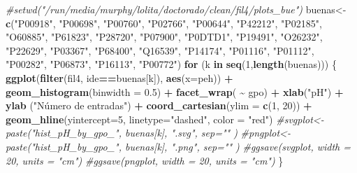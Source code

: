 \documentclass[
]{book}
\newenvironment{Shaded}{\begin{snugshade}}{\end{snugshade}}
\newcommand{\CommentTok}[1]{\textcolor[rgb]{0.56,0.35,0.01}{\textit{#1}}}
\newcommand{\ControlFlowTok}[1]{\textcolor[rgb]{0.13,0.29,0.53}{\textbf{#1}}}
\newcommand{\DataTypeTok}[1]{\textcolor[rgb]{0.13,0.29,0.53}{#1}}
\newcommand{\DecValTok}[1]{\textcolor[rgb]{0.00,0.00,0.81}{#1}}
\newcommand{\FloatTok}[1]{\textcolor[rgb]{0.00,0.00,0.81}{#1}}
\newcommand{\KeywordTok}[1]{\textcolor[rgb]{0.13,0.29,0.53}{\textbf{#1}}}
\newcommand{\NormalTok}[1]{#1}
\newcommand{\OperatorTok}[1]{\textcolor[rgb]{0.81,0.36,0.00}{\textbf{#1}}}
\newcommand{\StringTok}[1]{\textcolor[rgb]{0.31,0.60,0.02}{#1}}
\begin{document}
\begin{Shaded}
\begin{Highlighting}[]
\CommentTok{\#setwd("/run/media/murphy/lolita/doctorado/clean/fil4/plots\_bue")}
\NormalTok{buenas\textless{}{-}}\KeywordTok{c}\NormalTok{(}\StringTok{"P00918"}\NormalTok{, }\StringTok{"P00698"}\NormalTok{, }\StringTok{"P00760"}\NormalTok{, }\StringTok{"P02766"}\NormalTok{, }\StringTok{"P00644"}\NormalTok{, }\StringTok{"P42212"}\NormalTok{, }\StringTok{"P02185"}\NormalTok{, }\StringTok{"O60885"}\NormalTok{, }\StringTok{"P61823"}\NormalTok{, }\StringTok{"P28720"}\NormalTok{, }\StringTok{"P07900"}\NormalTok{, }\StringTok{"P0DTD1"}\NormalTok{, }\StringTok{"P19491"}\NormalTok{, }\StringTok{"O26232"}\NormalTok{, }\StringTok{"P22629"}\NormalTok{, }\StringTok{"P03367"}\NormalTok{, }\StringTok{"P68400"}\NormalTok{, }\StringTok{"Q16539"}\NormalTok{, }\StringTok{"P14174"}\NormalTok{, }\StringTok{"P01116"}\NormalTok{, }\StringTok{"P01112"}\NormalTok{, }\StringTok{"P00282"}\NormalTok{, }\StringTok{"P06873"}\NormalTok{, }\StringTok{"P16113"}\NormalTok{, }\StringTok{"P00772"}\NormalTok{)}
\ControlFlowTok{for}\NormalTok{ (k }\ControlFlowTok{in} \KeywordTok{seq}\NormalTok{(}\DecValTok{1}\NormalTok{,}\KeywordTok{length}\NormalTok{(buenas)))}
\NormalTok{\{}
\KeywordTok{ggplot}\NormalTok{(}\KeywordTok{filter}\NormalTok{(fil4, ide}\OperatorTok{==}\NormalTok{buenas[k]), }\KeywordTok{aes}\NormalTok{(}\DataTypeTok{x=}\NormalTok{peh)) }\OperatorTok{+}\StringTok{ }\KeywordTok{geom\_histogram}\NormalTok{(}\DataTypeTok{binwidth =} \FloatTok{0.5}\NormalTok{) }\OperatorTok{+}\StringTok{ }\KeywordTok{facet\_wrap}\NormalTok{( }\OperatorTok{\textasciitilde{}}\StringTok{ }\NormalTok{gpo) }\OperatorTok{+}\StringTok{ }\KeywordTok{xlab}\NormalTok{(}\StringTok{"pH"}\NormalTok{) }\OperatorTok{+}\StringTok{ }\KeywordTok{ylab}\NormalTok{ (}\StringTok{"Número de entradas"}\NormalTok{) }\OperatorTok{+}\StringTok{ }\KeywordTok{coord\_cartesian}\NormalTok{(}\DataTypeTok{ylim =} \KeywordTok{c}\NormalTok{(}\DecValTok{1}\NormalTok{, }\DecValTok{20}\NormalTok{)) }\OperatorTok{+}\StringTok{ }\KeywordTok{geom\_hline}\NormalTok{(}\DataTypeTok{yintercept=}\DecValTok{5}\NormalTok{, }\DataTypeTok{linetype=}\StringTok{"dashed"}\NormalTok{, }\DataTypeTok{color =} \StringTok{"red"}\NormalTok{)}
\CommentTok{\#svgplot\textless{}{-}paste("hist\_pH\_by\_gpo\_", buenas[k], ".svg", sep="" )}
\CommentTok{\#pngplot\textless{}{-}paste("hist\_pH\_by\_gpo\_", buenas[k], ".png", sep="" )}
\CommentTok{\#ggsave(svgplot, width = 20, units = "cm") }
\CommentTok{\#ggsave(pngplot, width = 20, units = "cm")}
\NormalTok{\}}
\end{Highlighting}
\end{Shaded}
\end{document}
